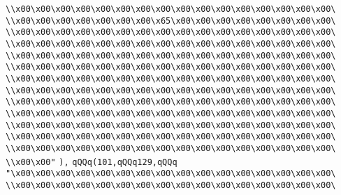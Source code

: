 \verb|\\x00\x00\x00\x00\x00\x00\x00\x00\x00\x00\x00\x00\x00\x00\x00\x00\|\newline
\verb|\\x00\x00\x00\x00\x00\x00\x00\x65\x00\x00\x00\x00\x00\x00\x00\x00\|\newline
\verb|\\x00\x00\x00\x00\x00\x00\x00\x00\x00\x00\x00\x00\x00\x00\x00\x00\|\newline
\verb|\\x00\x00\x00\x00\x00\x00\x00\x00\x00\x00\x00\x00\x00\x00\x00\x00\|\newline
\verb|\\x00\x00\x00\x00\x00\x00\x00\x00\x00\x00\x00\x00\x00\x00\x00\x00\|\newline
\verb|\\x00\x00\x00\x00\x00\x00\x00\x00\x00\x00\x00\x00\x00\x00\x00\x00\|\newline
\verb|\\x00\x00\x00\x00\x00\x00\x00\x00\x00\x00\x00\x00\x00\x00\x00\x00\|\newline
\verb|\\x00\x00\x00\x00\x00\x00\x00\x00\x00\x00\x00\x00\x00\x00\x00\x00\|\newline
\verb|\\x00\x00\x00\x00\x00\x00\x00\x00\x00\x00\x00\x00\x00\x00\x00\x00\|\newline
\verb|\\x00\x00\x00\x00\x00\x00\x00\x00\x00\x00\x00\x00\x00\x00\x00\x00\|\newline
\verb|\\x00\x00\x00\x00\x00\x00\x00\x00\x00\x00\x00\x00\x00\x00\x00\x00\|\newline
\verb|\\x00\x00\x00\x00\x00\x00\x00\x00\x00\x00\x00\x00\x00\x00\x00\x00\|\newline
\verb|\\x00\x00\x00\x00\x00\x00\x00\x00\x00\x00\x00\x00\x00\x00\x00\x00\|\newline
\verb|\\x00\x00"|\newline
\verb|),|\newline
\verb|qQQq(101,qQQq129,qQQq|\newline
\verb|"\x00\x00\x00\x00\x00\x00\x00\x00\x00\x00\x00\x00\x00\x00\x00\x00\|\newline
\verb|\\x00\x00\x00\x00\x00\x00\x00\x00\x00\x00\x00\x00\x00\x00\x00\x00\|\newline
